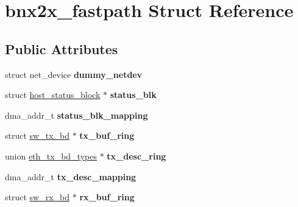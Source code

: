\hypertarget{structbnx2x__fastpath}{
\section{bnx2x\_\-fastpath Struct Reference}
\label{structbnx2x__fastpath}
}
\subsection*{Public Attributes}
\begin{DoxyCompactItemize}
\item 
\hypertarget{structbnx2x__fastpath_ac70b4786ae8fa44f6df8af0c37f8c823}{
struct net\_\-device {\bfseries dummy\_\-netdev}}
\label{structbnx2x__fastpath_ac70b4786ae8fa44f6df8af0c37f8c823}

\item 
\hypertarget{structbnx2x__fastpath_a80c99965fcf8bf3e20ff92332af46851}{
struct \hyperlink{structhost__status__block}{host\_\-status\_\-block} $\ast$ {\bfseries status\_\-blk}}
\label{structbnx2x__fastpath_a80c99965fcf8bf3e20ff92332af46851}

\item 
\hypertarget{structbnx2x__fastpath_a1b75cda0ecedb920b4fe7b37305f07da}{
dma\_\-addr\_\-t {\bfseries status\_\-blk\_\-mapping}}
\label{structbnx2x__fastpath_a1b75cda0ecedb920b4fe7b37305f07da}

\item 
\hypertarget{structbnx2x__fastpath_a11e5fb61b3d88318eb73543df7b533fe}{
struct \hyperlink{structsw__tx__bd}{sw\_\-tx\_\-bd} $\ast$ {\bfseries tx\_\-buf\_\-ring}}
\label{structbnx2x__fastpath_a11e5fb61b3d88318eb73543df7b533fe}

\item 
\hypertarget{structbnx2x__fastpath_ae731d2892b50f457f50b8e8ea42f1dcf}{
union \hyperlink{unioneth__tx__bd__types}{eth\_\-tx\_\-bd\_\-types} $\ast$ {\bfseries tx\_\-desc\_\-ring}}
\label{structbnx2x__fastpath_ae731d2892b50f457f50b8e8ea42f1dcf}

\item 
\hypertarget{structbnx2x__fastpath_ad89d105ee07c6b5331c583b583bfd3f9}{
dma\_\-addr\_\-t {\bfseries tx\_\-desc\_\-mapping}}
\label{structbnx2x__fastpath_ad89d105ee07c6b5331c583b583bfd3f9}

\item 
\hypertarget{structbnx2x__fastpath_ac45647d62796d1e30ce17841244a5d3b}{
struct \hyperlink{structsw__rx__bd}{sw\_\-rx\_\-bd} $\ast$ {\bfseries rx\_\-buf\_\-ring}}
\label{structbnx2x__fastpath_ac45647d62796d1e30ce17841244a5d3b}


\end{DoxyCompactItemize}
